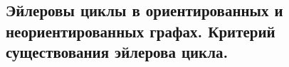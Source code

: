 \subsection{Эйлеровы циклы в ориентированных и неориентированных графах. Критерий существования эйлерова цикла.}
